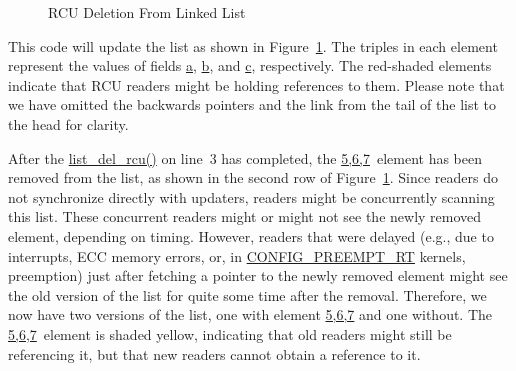 \begin{figure}[tb]
\begin{center}
\end{center}
\caption{RCU Deletion From Linked List}
\label{fig:defer:RCU Deletion From Linked List}
\end{figure}

This code will update the list as shown in
Figure~\ref{fig:defer:RCU Deletion From Linked List}.
The triples in each element represent the values of fields \url{a},
\url{b}, and \url{c}, respectively.
The red-shaded elements
indicate that RCU readers might be holding references to them.
Please note that
we have omitted the backwards pointers and the link from the tail
of the list to the head for clarity.

After the \url{list_del_rcu()} on
line~3 has completed, the \url{5,6,7}~element
has been removed from the list, as shown in the second row of
Figure~\ref{fig:defer:RCU Deletion From Linked List}.
Since readers do not synchronize directly with updaters,
readers might be concurrently scanning this list.
These concurrent readers might or might not see the newly removed element,
depending on timing.
However, readers that were delayed (e.g., due to interrupts, ECC memory
errors, or, in \url{CONFIG_PREEMPT_RT} kernels, preemption)
just after fetching a pointer to the newly removed element might
see the old version of the list for quite some time after the
removal.
Therefore, we now have two versions of the list, one with element
\url{5,6,7} and one without.
The \url{5,6,7}~element is
shaded yellow, indicating
that old readers might still be referencing it, but that new
readers cannot obtain a reference to it.

